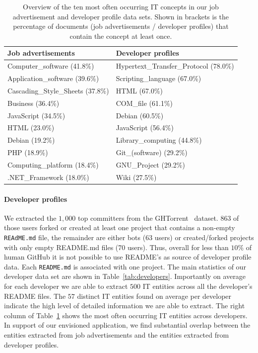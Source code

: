 \documentclass[conference]{IEEEtran}
\begin{document}
\begin{table}
\centering
\footnotesize
\begin{tabular}{ll}
\toprule
\textbf{Job advertisements}	& \textbf{Developer profiles}\\
\midrule
Computer\_software (41.8\%) 			& Hypertext\_Transfer\_Protocol (78.0\%) \\
Application\_software (39.6\%)		& Scripting\_language (67.0\%) \\
Cascading\_Style\_Sheets (37.8\%)	& HTML (67.0\%) \\
Business (36.4\%)								& COM\_file (61.1\%)\\
JavaScript (34.5\%)							& Debian (60.5\%)\\
HTML (23.0\%)									& JavaScript (56.4\%) \\
Debian (19.2\%)								& Library\_computing (44.8\%) \\
PHP (18.9\%)									& Git\_(software) (29.2\%) \\
Computing\_platform (18.4\%)		& GNU\_Project (29.2\%) \\
.NET\_Framework (18.0\%)				& Wiki (27.5\%)\\
\bottomrule
\end{tabular}
\caption{Overview of the ten most often occurring IT concepts in our job advertisement and developer profile data sets. Shown in brackets is the percentage of documents (job advertisements / developer profiles) that contain the concept at least once.}
\label{tab:top10}
\end{table}

\paragraph{Developer profiles}

We extracted the $1,000$ top committers from the GHTorrent~\cite{Gousi13} dataset. 863 of those users forked or created at least one project that contains a non-empty \texttt{REAdME.md} file, the remainder are either bots (63 users) or created/forked projects with only empty README.md files (70 users). Thus, overall for less than $10\%$ of human GitHub it is not possible to use README's as source of developer profile data. Each \texttt{README.md} is associated with one project. The main statistics of our developer data set are shown in Table~\ref{tab:developers}. Importantly on average for each developer we are able to extract $500$ IT entities across all the developer's README files. The $57$ distinct IT entities found on average per developer indicate the high level of detailed information we are able to extract. The right column of Table~\ref{tab:top10} shows the most often occurring IT entities across developers. In support of our envisioned application, we find substantial overlap between the entities extracted from job advertisements and the entities extracted from developer profiles.
\end{document}
